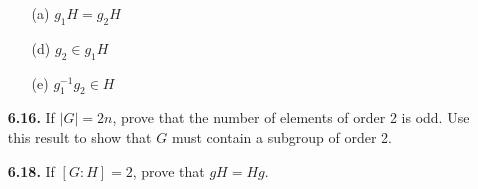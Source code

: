 \documentclass[12pt,reqno]{amsart}
\newcommand{\probskip}{\vskip1cm}
\begin{document}
\begin{enumerate}[{\bf 1.}]
\begin{enumerate}
\item[(a)]
$g_1 H = g_2 H$
 
\item[(d)]
$g_2 \in g_1 H$
 
\item[(e)]
$g_1^{-1} g_2 \in H$
\end{enumerate}

\probskip
 
\item[{\bf 6.16.}] 
If $|G| = 2n$, prove that the number of elements of order 2 is odd.  Use this
result to show that $G$ must contain a subgroup of order 2. 

\probskip

\item[{\bf 6.18.}] 
If $[G : H] = 2$, prove that $gH = Hg$.

\end{enumerate}
\end{document}

